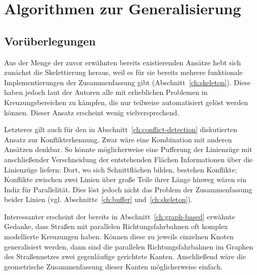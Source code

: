 \documentclass[../main/thesis.tex]{subfiles}
\begin{document}
\chapter{Algorithmen zur Generalisierung}

\section{Vorüberlegungen}



Aus der Menge der zuvor erwähnten bereits existierenden Ansätze hebt sich zunächst die Skelettierung heraus, weil es für sie bereits mehrere funktionale Implementierungen der Zusammenfassung gibt (Abschnitt~\ref{ch:skeleton}).
Diese haben jedoch laut der Autoren alle mit erheblichen Problemen in Kreuzungsbereichen zu kämpfen, die nur teilweise automatisiert gelöst werden können.
Dieser Ansatz erscheint wenig vielversprechend.

Letzteres gilt auch für den in Abschnitt~\ref{ch:conflict-detection} diskutierten Ansatz zur Konflikterkennung.
Zwar wäre eine Kombination mit anderen Ansätzen denkbar.
So könnte möglicherweise eine Pufferung der Linienzüge mit anschließender Verschneidung der entstehenden Flächen Informationen über die Linienzüge liefern:
Dort, wo sich Schnittflächen bilden, bestehen Konflikte;
Konflikte zwischen zwei Linien über große Teile ihrer Länge hinweg wären ein Indiz für Parallelität.
Dies löst jedoch nicht das Problem der Zusammenfassung beider Linien (vgl. Abschnitte~\ref{ch:buffer} und~\ref{ch:skeleton}).

Interessanter erscheint der bereits in Abschnitt~\ref{ch:graph-based} erwähnte Gedanke, dass Straßen mit parallelen Richtungsfahrbahnen oft komplex modellierte Kreuzungen haben.
Können diese zu jeweils einzelnen Knoten generalisiert werden, dann sind die parallelen Richtungsfahrbahnen im Graphen des Straßennetzes zwei gegenläufige gerichtete Kanten.
Anschließend wäre die geometrische Zusammenfassung dieser Kanten möglicherweise einfach.
\end{document}
